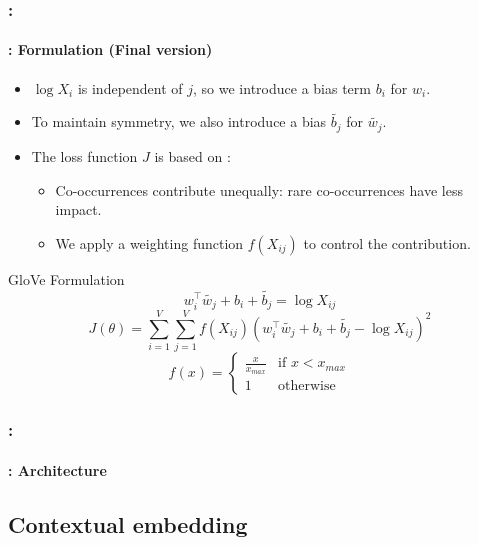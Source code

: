 \documentclass[xcolor=table]{beamer}
\begin{document}
\begin{frame}
	\frametitle{\insertshortsubtitle: \insertsection}
	\framesubtitle{\insertsubsection: Formulation (Final version)}
	
	\begin{itemize}
		\item $\log X_i$ is independent of $j$, so we introduce a bias term $b_i$ for $w_i$.
		\item To maintain symmetry, we also introduce a bias $\tilde{b_j}$ for $\tilde{w_j}$.
		\item The loss function $J$ is based on :
		\begin{itemize}
			\item Co-occurrences contribute unequally: rare co-occurrences have less impact.
			\item We apply a weighting function $f(X_{ij})$ to control the contribution.
		\end{itemize}
	\end{itemize}
	
	\vskip-2pt\begin{block}{GloVe Formulation}\vskip-2pt
		\[w_i^\top \tilde{w_j} + b_i + \tilde{b_j} = \log X_{ij} \]
		\[J(\theta) = \sum_{i=1}^{V} \sum_{j=1}^{V} f(X_{ij}) (w_i^\top \tilde{w_j} + b_i + \tilde{b_j} - \log X_{ij})^2\]
		\vskip-2pt\[f(x) = \begin{cases}
			\frac{x}{x_{max}} & \text{if } x < x_{max} \\
			1 & \text{otherwise}
		\end{cases}\]
	\end{block}
	
\end{frame}

\begin{frame}
	\frametitle{\insertshortsubtitle: \insertsection}
	\framesubtitle{\insertsubsection: Architecture}
	
	\begin{center}
	\end{center}
	
\end{frame}

\subsection{Contextual embedding}
\end{document}
